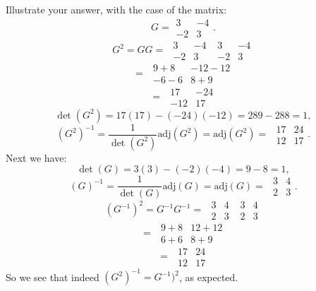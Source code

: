 \documentclass[12pt]{article}
\newcommand{\adj}{\textrm{adj}}
\begin{document}
Illustrate your answer, with the case of the matrix:
\[ G = \begin{array}{|cc|}3&-4\\-2&3\end{array}.\]
\[ G^2 = GG =  \hspace{4pt} \begin{array}{|cc|}3&-4\\-2&3\end{array} \hspace{4pt} \begin{array}{|cc|}3&-4\\-2&3\end{array}\]
\[ =  \hspace{4pt} \begin{array}{|cc|}9 + 8&-12 - 12\\-6 - 6&8 + 9\end{array}\]
\[ =  \hspace{4pt} \begin{array}{|cc|}17&-24\\-12&17\end{array}\]
\[ \det(G^2) = 17(17)-(-24)(-12) = 289 - 288 = 1, \]
\[ (G^2)^{-1} = \frac{1}{\det(G^2)}\adj(G^2) = \adj(G^2) = \hspace{4pt} \begin{array}{|cc|}17&24\\12&17\end{array}.\]
Next we have:
\[ \det(G) = 3(3) - (-2)(-4) = 9 - 8 = 1, \]
\[ (G)^{-1} = \frac{1}{\det(G)}\adj(G) = \adj(G) = \hspace{4pt} \begin{array}{|cc|}3&4\\2&3\end{array}.\]
\[ (G^{-1})^2 = G^{-1}G^{-1} =  \hspace{4pt} \begin{array}{|cc|}3&4\\2&3\end{array} \hspace{4pt} \begin{array}{|cc|}3&4\\2&3\end{array}\]
\[ =  \hspace{4pt} \begin{array}{|cc|}9 + 8&12 + 12\\6 + 6&8 + 9\end{array}\]
\[ =  \hspace{4pt} \begin{array}{|cc|}17&24\\12&17\end{array}\]
So we see that indeed $(G^2)^{-1} = G^{-1})^2$, as expected.
\end{document}
